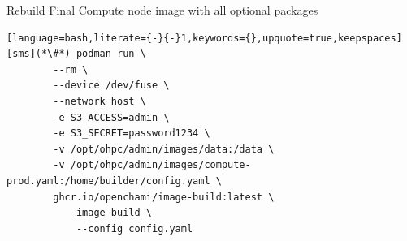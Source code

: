 Rebuild Final Compute node image with all optional packages

\begin{lstlisting}[language=bash,literate={-}{-}1,keywords={},upquote=true,keepspaces]
[sms](*\#*) podman run \
		--rm \
		--device /dev/fuse \
		--network host \
		-e S3_ACCESS=admin \
		-e S3_SECRET=password1234 \
		-v /opt/ohpc/admin/images/data:/data \
		-v /opt/ohpc/admin/images/compute-prod.yaml:/home/builder/config.yaml \
		ghcr.io/openchami/image-build:latest \
			image-build \
			--config config.yaml
\end{lstlisting}
